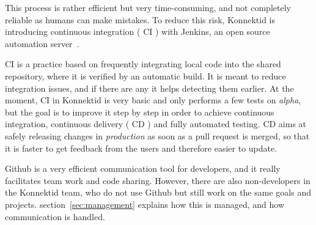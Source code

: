 This process is rather efficient but very time-consuming, and not completely reliable as humans can make mistakes. To reduce this risk, Konnektid is introducing continuous integration (\guillemotleft{} CI \guillemotright{}) with Jenkins, an open source automation server~\cite{jenkins}. 

CI is a practice based on frequently integrating local code into the shared repository, where it is verified by an automatic build. It is meant to reduce integration issues, and if there are any it helps detecting them earlier. At the moment, CI in Konnektid is very basic and only performs a few tests on \textit{alpha}, but the goal is to improve it step by step in order to achieve continuous integration, continuous delivery (\guillemotleft{} CD \guillemotright{}) and fully automated testing. CD aims at safely releasing changes in \textit{production} as soon as a pull request is merged, so that it is faster to get feedback from the users and therefore easier to update.

Github is a very efficient communication tool for developers, and it really facilitates team work and code sharing. However, there are also non-developers in the Konnektid team, who do not use Github but still work on the same goals and projects. {\sc section}~\ref{sec:management} explains how this is managed, and how communication is handled.